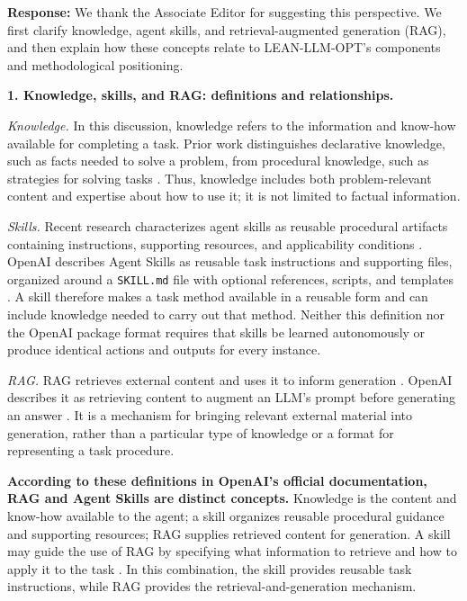 {\color{blue}
\noindent\textbf{Response:}
We thank the Associate Editor for suggesting this perspective.
We first clarify knowledge, agent skills, and retrieval-augmented
generation (RAG), and then explain how these concepts relate to
LEAN-LLM-OPT's components and methodological positioning.

\medskip
\noindent\textbf{1. Knowledge, skills, and RAG: definitions and relationships.}

\emph{Knowledge.} In this discussion, knowledge refers to the
information and know-how available for completing a task.
Prior work distinguishes declarative knowledge, such as facts
needed to solve a problem, from procedural knowledge, such as
strategies for solving tasks \citep{ae1_li2024metacognitive}.
Thus, knowledge includes both problem-relevant content and
expertise about how to use it; it is not limited to factual
information.

\emph{Skills.} Recent research characterizes agent skills as
reusable procedural artifacts containing instructions, supporting
resources, and applicability conditions
\citep{ae1_zhou2026skillsurvey}. OpenAI describes Agent Skills as
reusable task instructions and supporting files, organized around
a \texttt{SKILL.md} file with optional references, scripts, and
templates \citep{ae1_openai2026skills}. A skill therefore makes a
task method available in a reusable form and can include knowledge
needed to carry out that method. Neither this definition nor the
OpenAI package format requires that skills be learned autonomously
or produce identical actions and outputs for every instance.

\emph{RAG.} RAG retrieves external content and uses it to inform
generation \citep{ae1_lewis2020rag}. OpenAI describes it as
retrieving content to augment an LLM's prompt before generating
an answer \citep{ae1_openai2026accuracy}. It is a mechanism for
bringing relevant external material into generation, rather than
a particular type of knowledge or a format for representing a
task procedure.

\textbf{According to these definitions in OpenAI's official
 documentation, RAG and Agent Skills are distinct concepts.}
Knowledge is the content and know-how available to the agent;
a skill organizes reusable procedural guidance and supporting
resources; RAG supplies retrieved content for generation.
A skill may guide the use of RAG by specifying what information
to retrieve and how to apply it to the task
\citep{ae1_openai2026skilltools}. In this combination, the skill
provides reusable task instructions, while RAG provides the
retrieval-and-generation mechanism.

}
